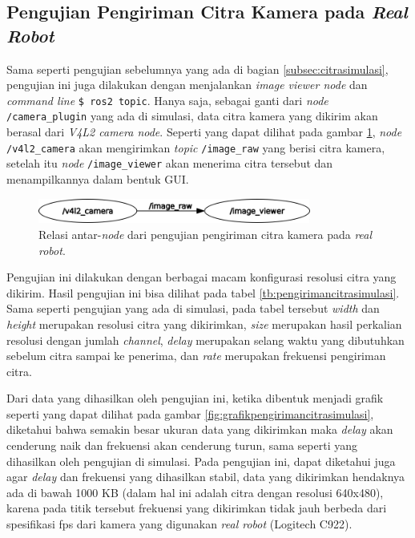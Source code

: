 \subsection{Pengujian Pengiriman Citra Kamera pada \emph{Real Robot}}
\label{subsec:citrarobot}

Sama seperti pengujian sebelumnya yang ada di bagian \ref{subsec:citrasimulasi},
  pengujian ini juga dilakukan dengan menjalankan \emph{image viewer node} dan \emph{command line} \lstinline{$ ros2 topic}.
Hanya saja, sebagai ganti dari \emph{node} \lstinline{/camera_plugin} yang ada di simulasi,
  data citra kamera yang dikirim akan berasal dari \emph{V4L2 camera node}.
Seperti yang dapat dilihat pada gambar \ref{fig:rosgraphcamera},
  \emph{node} \lstinline{/v4l2_camera} akan mengirimkan \emph{topic} \lstinline{/image_raw} yang berisi citra kamera,
  setelah itu \emph{node} \lstinline{/image_viewer} akan menerima citra tersebut dan menampilkannya dalam bentuk GUI.

\begin{figure}[ht]
  \centering
  \includegraphics[width=0.8\textwidth,keepaspectratio]{gambar/rosgraph-camera.png}
  \caption{Relasi antar-\emph{node} dari pengujian pengiriman citra kamera pada \emph{real robot}.}
  \label{fig:rosgraphcamera}
\end{figure}

Pengujian ini dilakukan dengan berbagai macam konfigurasi resolusi citra yang dikirim.
Hasil pengujian ini bisa dilihat pada tabel \ref{tb:pengirimancitrasimulasi}.
Sama seperti pengujian yang ada di simulasi, pada tabel tersebut \emph{width} dan \emph{height} merupakan resolusi citra yang dikirimkan,
  \emph{size} merupakan hasil perkalian resolusi dengan jumlah \emph{channel},
  \emph{delay} merupakan selang waktu yang dibutuhkan sebelum citra sampai ke penerima,
  dan \emph{rate} merupakan frekuensi pengiriman citra.

  


Dari data yang dihasilkan oleh pengujian ini,
  ketika dibentuk menjadi grafik seperti yang dapat dilihat pada gambar \ref{fig:grafikpengirimancitrasimulasi},
  diketahui bahwa semakin besar ukuran data yang dikirimkan maka \emph{delay} akan cenderung naik dan frekuensi akan cenderung turun,
  sama seperti yang dihasilkan oleh pengujian di simulasi.
Pada pengujian ini, dapat diketahui juga agar \emph{delay} dan frekuensi yang dihasilkan stabil,
  data yang dikirimkan hendaknya ada di bawah 1000 KB (dalam hal ini adalah citra dengan resolusi 640x480),
  karena pada titik tersebut frekuensi yang dikirimkan tidak jauh berbeda dari spesifikasi fps dari kamera yang digunakan \emph{real robot} (Logitech C922).
